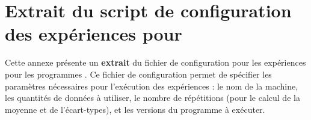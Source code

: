 \chapter{Extrait du script de configuration des expériences pour }

\label{ExperiencesPreliminairesWordCount.ann}

Cette annexe pr\'esente un \textbf{extrait} du fichier de
configuration pour les expériences pour les programmes
. Ce fichier de configuration permet de sp\'ecifier les
param\`etres nécessaires pour l'ex\'ecution des exp\'eriences : le nom
de la machine, les quantit\'es de donn\'ees à utiliser, le nombre de
r\'ep\'etitions (pour le calcul de la moyenne et de l'écart-types), et
les versions du programme \`a ex\'ecuter.


\pagebreak



